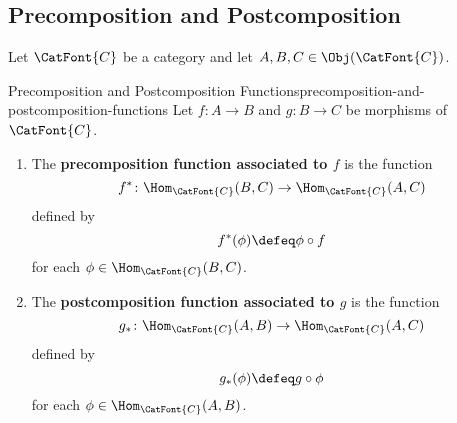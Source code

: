 \subsection{Precomposition and Postcomposition}\label{subsection-precomposition-and-postcomposition}
Let $\CatFont{C}$ be a category and let $A,B,C\in\Obj(\CatFont{C})$.
\begin{definition}{Precomposition and Postcomposition Functions}{precomposition-and-postcomposition-functions}%
    Let $f\colon A\to B$ and $g\colon B\to C$ be morphisms of $\CatFont{C}$.
    \begin{enumerate}
        \item\label{precomposition-and-postcomposition-functions-precomposition}The \textbf{precomposition function associated to $f$} is the function%
            \[
                f^{*}
                \colon
                \Hom_{\CatFont{C}}(B,C)
                \to
                \Hom_{\CatFont{C}}(A,C)
            \]%
            defined by
            \[
                f^{*}(\phi)
                \defeq
                \phi\circ f
            \]%
            for each $\phi\in\Hom_{\CatFont{C}}(B,C)$.
        \item\label{precomposition-and-postcomposition-functions-postcomposition}The \textbf{postcomposition function associated to $g$} is the function%
            \[
                g_{*}
                \colon
                \Hom_{\CatFont{C}}(A,B)
                \to
                \Hom_{\CatFont{C}}(A,C)
            \]%
            defined by
            \[
                g_{*}(\phi)
                \defeq
                g\circ\phi
            \]%
            for each $\phi\in\Hom_{\CatFont{C}}(A,B)$.
    \end{enumerate}
\end{definition}
